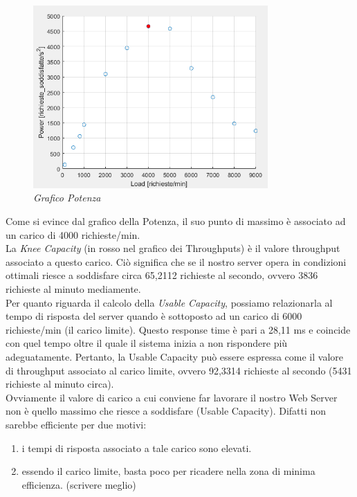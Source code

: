 \begin{figure}[H]
	\centering
	\includegraphics[width=0.8\textwidth]{img/hw2/Potenza.png}
	\caption{\textit{Grafico Potenza}}
\end{figure}
\newpage

Come si evince dal grafico della Potenza, il suo punto di massimo è associato ad un carico di 4000 richieste/min. 
\\
La \textit{Knee Capacity} (in rosso nel grafico dei Throughputs) è il valore throughput associato a questo carico. Ciò significa che se il nostro server opera in condizioni ottimali riesce a soddisfare circa 65,2112 richieste al secondo, ovvero 3836 richieste al minuto mediamente.
\\

Per quanto riguarda il calcolo della \textit{Usable Capacity}, possiamo relazionarla al tempo di risposta del server quando è sottoposto ad un carico di 6000 richieste/min (il carico limite). Questo response time è pari a 28,11 ms e coincide con quel tempo oltre il quale il sistema inizia a non rispondere più adeguatamente. Pertanto, la Usable Capacity può essere espressa come il valore di throughput associato al carico limite, ovvero 92,3314 richieste al secondo (5431 richieste al minuto circa).
\\
Ovviamente il valore di carico a cui conviene far lavorare il nostro Web Server non è quello massimo che riesce a soddisfare (Usable Capacity). Difatti non sarebbe efficiente per due motivi:
\begin{enumerate}
	\item i tempi di risposta associato a tale carico sono elevati.
	\item essendo il carico limite, basta poco per ricadere nella zona di minima efficienza. (scrivere meglio)
\end{enumerate}
